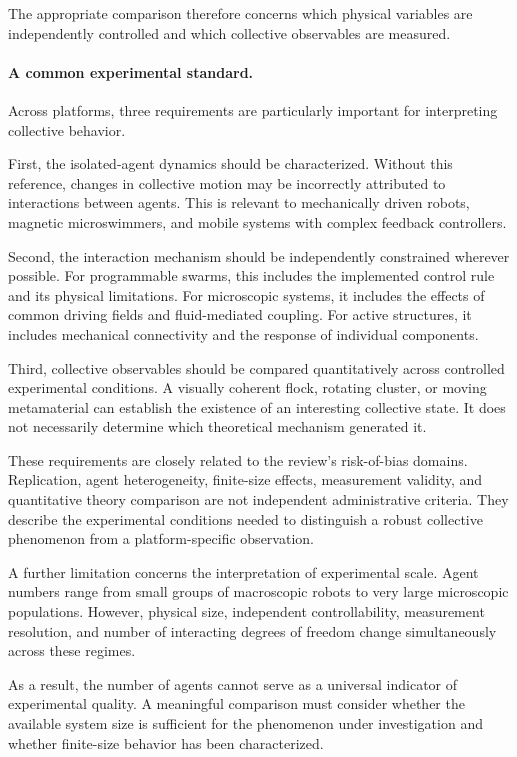 The appropriate comparison
therefore concerns which
physical variables are
independently controlled
and which collective
observables are measured.

\paragraph*{A common experimental standard.}

Across platforms, three requirements are particularly
important for interpreting collective behavior.

First, the isolated-agent dynamics should be
characterized. Without this reference, changes
in collective motion may be incorrectly attributed
to interactions between agents. This is relevant
to mechanically driven robots, magnetic
microswimmers, and mobile systems with complex
feedback controllers.

Second, the interaction mechanism should
be independently constrained wherever
possible. For programmable swarms,
this includes the implemented control
rule and its physical limitations.
For microscopic systems, it includes
the effects of common driving fields
and fluid-mediated coupling.
For active structures, it includes
mechanical connectivity and the
response of individual components.

Third, collective observables should
be compared quantitatively across
controlled experimental conditions.
A visually coherent flock,
rotating cluster, or moving
metamaterial can establish the
existence of an interesting
collective state. It does not
necessarily determine which
theoretical mechanism generated it.

These requirements are closely related
to the review's risk-of-bias
domains. Replication, agent
heterogeneity, finite-size
effects, measurement validity,
and quantitative theory
comparison are not independent
administrative criteria.
They describe the experimental
conditions needed to distinguish
a robust collective phenomenon
from a platform-specific
observation.

A further limitation concerns
the interpretation of
experimental scale.
Agent numbers range from
small groups of macroscopic
robots to very large
microscopic populations.
However, physical size,
independent controllability,
measurement resolution,
and number of interacting
degrees of freedom
change simultaneously
across these regimes.

As a result, the number
of agents cannot serve
as a universal indicator
of experimental quality.
A meaningful comparison
must consider whether
the available system
size is sufficient for
the phenomenon under
investigation and whether
finite-size behavior
has been characterized.

